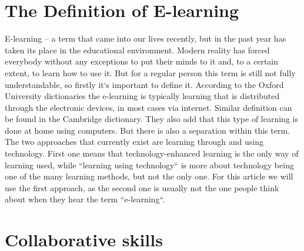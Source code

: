 \documentclass[10pt,twoside,English,a4paper]{article}
\begin{document}
\section{The Definition of E-learning} \label{definition}

E-learning – a term that came into our lives recently, but in the past year has taken its place in the educational environment. Modern reality has forced everybody without any exceptions to put their minds to it and, to a certain extent, to learn how to use it. But for a regular person this term is still not fully understandable, so firstly it`s important to define it.
According to the Oxford University dictionaries the e-learning is typically learning that is distributed through the electronic devices, in most cases via internet. Similar definition can be found in the Cambridge dictionary. They also add that this type of learning is done at home using computers.
But there is also a separation within this term. The two approaches that currently exist are learning through and using technology. First one means that technology-enhanced learning is the only way of learning used, while ``learning using technology`` is more about technology being one of the many learning methods, but not the only one. For this article we will use the first approach, as the second one is usually not the one people think about when they hear the term ``e-learning``.

\section{Collaborative skills} \label{collab}
\end{document}
